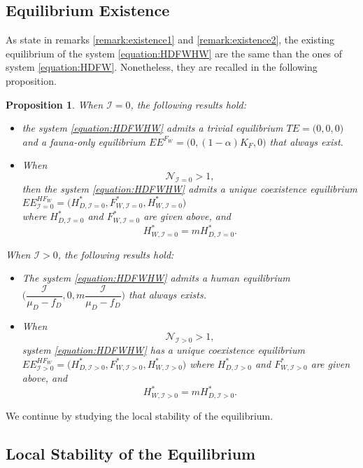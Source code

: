 \documentclass{article}
\newcommand{\cI}{\mathcal{I}}
\newtheorem{prop}{Proposition}
\begin{document}
\subsection{Equilibrium Existence}

As state in remarks \ref{remark:existence1} and \ref{remark:existence2}, the existing equilibrium of the system \eqref{equation:HDFWHW} are the same than the ones of system \eqref{equation:HDFW}. Nonetheless, they are recalled in the following proposition.

\begin{prop}
When $\cI = 0$, the following results hold:
\begin{itemize}
\item the system \eqref{equation:HDFWHW} admits a trivial equilibrium $TE = \Big(0,0, 0\Big)$ and a fauna-only equilibrium $EE^{F_W} = \Big(0, (1-\alpha)K_F,0 \Big)$ that always exist.

\item When
$$
\mathcal{N}_{\cI = 0} > 1,
$$ 
then the system \eqref{equation:HDFWHW} admits a unique coexistence equilibrium $EE^{HF_W}_{\cI = 0} = \Big(H^*_{D, \cI = 0}, F^*_{W, \cI = 0}, H^*_{W, \cI = 0}\Big)$ \\ 
where $H^*_{D, \cI = 0}$ and $F^*_{W, \cI = 0}$ are given above, and
$$ 
H^*_{W, \cI = 0} = m H^*_{D, \cI = 0}.
$$
\end{itemize}

When $\cI > 0$, the following results hold:
\begin{itemize}
\item The system \eqref{equation:HDFWHW} admits a human equilibrium $\Big(\dfrac{\cI}{\mu_D - f_D}, 0, m\dfrac{\cI}{\mu_D - f_D} \Big)$ that always exists.
\item When 
$$ \mathcal{N}_{\cI >0}  > 1,$$
system \eqref{equation:HDFWHW} has a unique coexistence equilibrium $EE^{HF_W}_{\cI > 0} = \Big(H^*_{D, \cI > 0}, F^*_{W, \cI > 0}, H^*_{W, \cI > 0}\Big)$
where $H^*_{D, \cI > 0}$ and $F^*_{W, \cI > 0}$ are given above, and
$$ 
H^*_{W, \cI > 0} = m H^*_{D, \cI > 0}.
$$
\end{itemize} 
\end{prop}  

We continue by studying the local stability of the equilibrium.

\subsection{Local Stability of the Equilibrium}
\end{document}
